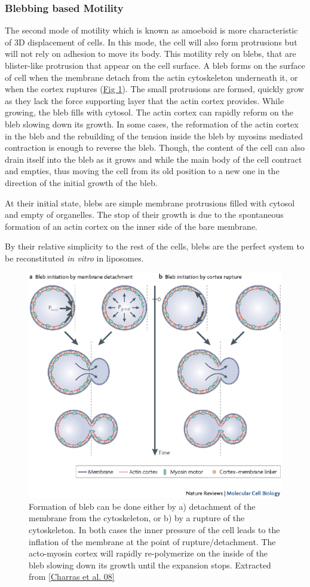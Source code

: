 \documentclass[A4paperpaper,11pt,english]{sphinxmanual}
\begin{document}
\subsubsection{Blebbing based Motility}
\label{parts/part1:blebbing-based-motility}
The second mode of motility which is known as amoeboid is more characteristic
of 3D displacement of cells. In this mode, the cell will also form protrusions
but will not rely on adhesion to move its body. This motility rely on blebs,
that are blister-like protrusion that appear on the cell surface. A bleb
forms on the surface of cell when the membrane detach from the actin
cytoskeleton underneath it, or when the cortex ruptures (\hyperref[parts/part1:fig-bleb]{Fig  \ref*{parts/part1:fig-bleb}}). The small protrusions
are formed, quickly grow as they lack the force supporting layer that the actin
cortex provides. While growing, the bleb fills with cytosol. The actin
cortex can rapidly reform on the bleb slowing down its growth. In some cases,
the reformation of the actin cortex in the bleb and the rebuilding of the
tension inside the bleb by myosins mediated contraction is enough to reverse
the bleb. Though, the content of the cell can also drain itself into the bleb
as it grows and while the main body of the cell contract and empties, thus
moving the cell from its old position to a new one in the direction of the
initial growth of the bleb.

At their initial state, blebs are simple membrane protrusions filled with
cytosol and empty of organelles. The stop of their growth is due to the
spontaneous formation of an actin cortex on the inner side of the bare
membrane.

By their relative simplicity to the rest of the cells, blebs are the perfect
system to be reconstituted \emph{in vitro} in liposomes.
\begin{figure}[htbp]
\centering
\capstart

\includegraphics[width=0.400\linewidth]{Bleb-nature-paluch.jpg}
\caption{Formation of bleb can be done either by a) detachment of the membrane from
the cytoskeleton, or b) by a rupture of the cytoskeleton. In both cases the
inner pressure of the cell leads to the inflation of the membrane at the
point of rupture/detachment. The acto-myosin cortex will rapidly re-polymerize on
the inside of the bleb slowing down its growth until the expansion stops.
Extracted from {\hyperref[parts/part1:charras2008]{{[}Charras et al. 08{]}}}}\label{parts/part1:fig-bleb}\end{figure}
\end{document}
